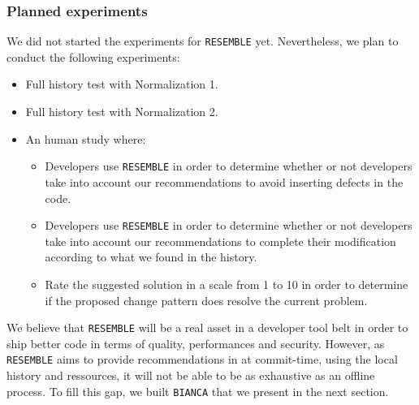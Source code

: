 \subsubsection{Planned experiments}

We did not started the experiments for {\tt RESEMBLE} yet. Nevertheless, we plan to conduct the following experiments:

\begin{itemize}
	\item Full history test with Normalization 1.
	\item Full history test with Normalization 2.
	\item An human study where:
	\begin{itemize}
		\item Developers use {\tt RESEMBLE} in order to determine whether or not developers take into account our recommendations to avoid inserting defects in the code.
		\item Developers use {\tt RESEMBLE} in order to determine whether or not developers take into account our recommendations to complete their modification according to what we found in the history.
		\item Rate the suggested solution in a scale from 1 to 10 in order to determine if the proposed change pattern does resolve the current problem.
	\end{itemize}
\end{itemize}

We believe that {\tt RESEMBLE} will be a real asset in a developer tool belt in order to ship better code in terms of quality, performances and security.
However, as {\tt RESEMBLE} aims to provide recommendations in at commit-time, using the local history and ressources, it will not be able to be as exhaustive as an offline process.
To fill this gap, we built {\tt BIANCA} that we present in the next section.
